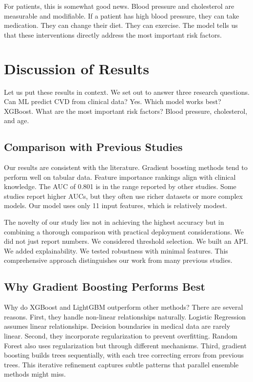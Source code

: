 \documentclass[12pt, a4paper, oneside]{book}
\begin{document}
For patients, this is somewhat good news. Blood pressure and cholesterol are measurable and modifiable. If a patient has high blood pressure, they can take medication. They can change their diet. They can exercise. The model tells us that these interventions directly address the most important risk factors.

\section{Discussion of Results}
Let us put these results in context. We set out to answer three research questions. Can ML predict CVD from clinical data? Yes. Which model works best? XGBoost. What are the most important risk factors? Blood pressure, cholesterol, and age.

\subsection{Comparison with Previous Studies}
Our results are consistent with the literature. Gradient boosting methods tend to perform well on tabular data. Feature importance rankings align with clinical knowledge. The AUC of 0.801 is in the range reported by other studies. Some studies report higher AUCs, but they often use richer datasets or more complex models. Our model uses only 11 input features, which is relatively modest.

The novelty of our study lies not in achieving the highest accuracy but in combining a thorough comparison with practical deployment considerations. We did not just report numbers. We considered threshold selection. We built an API. We added explainability. We tested robustness with minimal features. This comprehensive approach distinguishes our work from many previous studies.

\subsection{Why Gradient Boosting Performs Best}
Why do XGBoost and LightGBM outperform other methods? There are several reasons. First, they handle non-linear relationships naturally. Logistic Regression assumes linear relationships. Decision boundaries in medical data are rarely linear. Second, they incorporate regularization to prevent overfitting. Random Forest also uses regularization but through different mechanisms. Third, gradient boosting builds trees sequentially, with each tree correcting errors from previous trees. This iterative refinement captures subtle patterns that parallel ensemble methods might miss.
\end{document}
